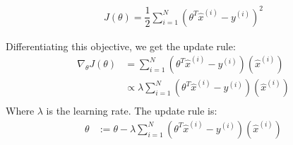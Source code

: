 \begin{answer}
\begin{align*}
    J(\theta)=\dfrac{1}{2}\sum_{i=1}^{N}(\theta^T\hat{x}^{(i)}-y^{(i)})^{2}
\end{align*}

Differentiating this objective, we get the update rule:
\begin{align*}
    \nabla_{\theta} J(\theta)&=\sum_{i=1}^{N}(\theta^T\hat{x}^{(i)}-y^{(i)})(\hat{x}^{(i)})\\
    &\propto \lambda \sum_{i=1}^{N}(\theta^T\hat{x}^{(i)}-y^{(i)})(\hat{x}^{(i)})\\
\end{align*}
Where $\lambda$ is the learning rate.
The update rule is:
\begin{align*}
    \theta &:=\theta - \lambda \sum_{i=1}^{N}(\theta^T\hat{x}^{(i)}-y^{(i)})(\hat{x}^{(i)})\\
\end{align*}

\end{answer}
